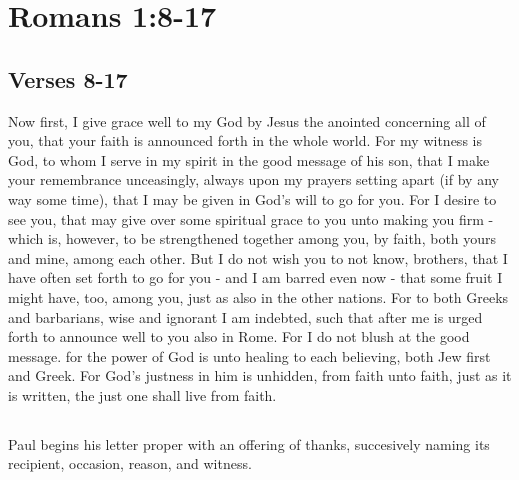 \chapter{Romans 1:8-17}
\section{Verses 8-17}
Now first, I give grace well to my God by Jesus the anointed concerning all of you, that your faith is announced forth in the whole world. For my witness is God, to whom I serve in my spirit in the good message of his son, that I make your remembrance unceasingly, always upon my prayers setting apart (if by any way some time), that I may be given in God's will to go for you. For I desire to see you, that may give over some spiritual grace to you unto making you firm - which is, however, to be strengthened together among you, by faith, both yours and mine, among each other. But I do not wish you to not know, brothers, that I have often set forth to go for you -  and I am barred even now - that some fruit I might have, too, among you, just as also in the other nations. For  to both Greeks and barbarians, wise and ignorant I am indebted, such that after me is urged forth to announce well to you also in Rome. For I do not blush at the good message. for the power of God is unto healing to each believing, both Jew first and Greek. For God's justness in him is unhidden, from faith unto faith, just as it is written, the just one shall live from faith. 

\section{}
Paul begins his letter proper with an offering of thanks, succesively naming its recipient, occasion, reason, and witness.